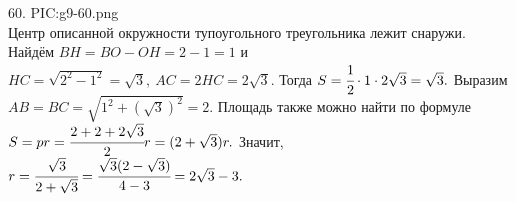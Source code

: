 60. {{PIC:g9-60.png}}\\
Центр описанной окружности тупоугольного треугольника лежит снаружи. Найдём $BH=BO-OH=2-1=1$ и $HC=\sqrt{2^2-1^2}=\sqrt{3},\ AC=2HC=2\sqrt{3}.$ Тогда $S=\cfrac{1}{2}\cdot1\cdot2\sqrt{3}=\sqrt{3}.$ Выразим $AB=BC=\sqrt{1^2+(\sqrt{3})^2}=2.$ Площадь также можно найти по формуле $S=pr=\cfrac{2+2+2\sqrt{3}}{2}r=(2+\sqrt{3})r.$ Значит, $r=\cfrac{\sqrt{3}}{2+\sqrt{3}}=\cfrac{\sqrt{3}(2-\sqrt{3})}{4-3}=2\sqrt{3}-3.$\\
